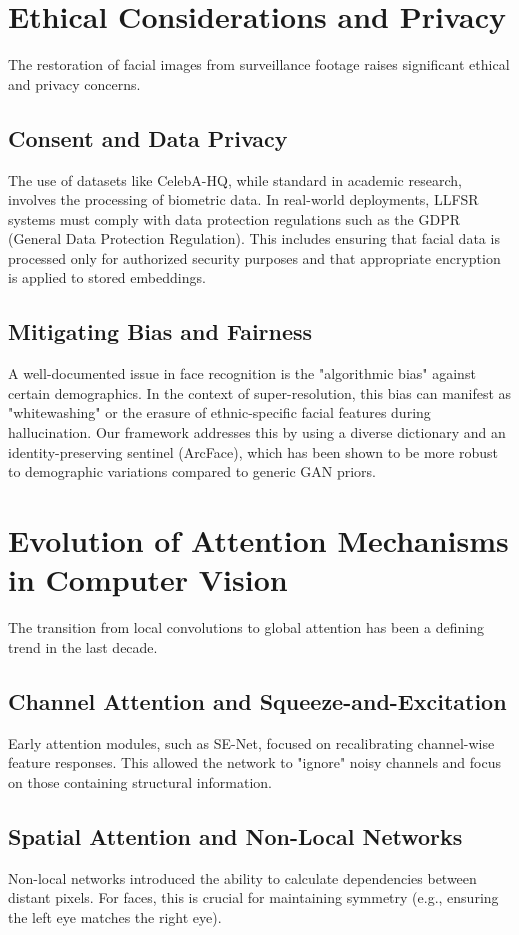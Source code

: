 \section{Ethical Considerations and Privacy}
The restoration of facial images from surveillance footage raises significant ethical and privacy concerns. 

\subsection{Consent and Data Privacy}
The use of datasets like CelebA-HQ, while standard in academic research, involves the processing of biometric data. In real-world deployments, LLFSR systems must comply with data protection regulations such as the GDPR (General Data Protection Regulation). This includes ensuring that facial data is processed only for authorized security purposes and that appropriate encryption is applied to stored embeddings.

\subsection{Mitigating Bias and Fairness}
A well-documented issue in face recognition is the "algorithmic bias" against certain demographics. In the context of super-resolution, this bias can manifest as "whitewashing" or the erasure of ethnic-specific facial features during hallucination. Our framework addresses this by using a diverse dictionary and an identity-preserving sentinel (ArcFace), which has been shown to be more robust to demographic variations compared to generic GAN priors.

\section{Evolution of Attention Mechanisms in Computer Vision}
The transition from local convolutions to global attention has been a defining trend in the last decade.

\subsection{Channel Attention and Squeeze-and-Excitation}
Early attention modules, such as SE-Net, focused on recalibrating channel-wise feature responses. This allowed the network to "ignore" noisy channels and focus on those containing structural information.

\subsection{Spatial Attention and Non-Local Networks}
Non-local networks introduced the ability to calculate dependencies between distant pixels. For faces, this is crucial for maintaining symmetry (e.g., ensuring the left eye matches the right eye).


